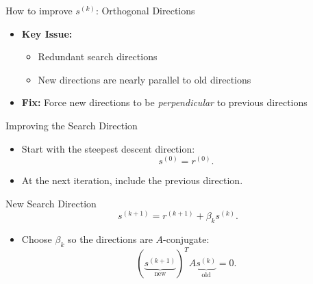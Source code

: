 \documentclass[10pt]{beamer}
\begin{document}
\begin{frame}{How to improve $s^{(k)}$: Orthogonal Directions}

\begin{itemize}

    \item \textbf{Key Issue:} 
    \begin{itemize}
        \item Redundant search directions
        \item New directions are nearly parallel to old directions  
    \end{itemize}
    \vfill
    \item \textbf{Fix:} Force new directions to be \textit{perpendicular} to previous directions

\end{itemize}
    {
    }

\end{frame}

\begin{frame}{Improving the Search Direction}

\begin{itemize}
    \item Start with the steepest descent direction:
    \[
        s^{(0)}=r^{(0)}.
    \]

    \item At the next iteration, include the previous direction.
\end{itemize}

\begin{block}{New Search Direction}
\[
    s^{(k+1)}=r^{(k+1)}+\beta_k s^{(k)}.
\]
\end{block}

\begin{itemize}
    \item Choose $\beta_k$ so the directions are $A$-conjugate:
    \[
        (\underbrace{s^{(k+1)}}_{\text{new}})^T A \underbrace{s^{(k)}}_{\text{old}}=0.
    \]
\end{itemize}

\end{frame}
\end{document}
